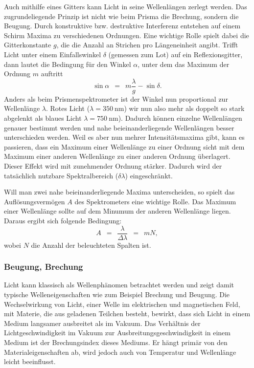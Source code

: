 \documentclass{article}
\newcommand{\widespace}{\enspace}
\newcommand{\wideeq}{\widespace = \widespace}
\begin{document}
Auch mithilfe eines Gitters kann Licht in seine Wellenlängen zerlegt werden.
Das zugrundeliegende Prinzip ist nicht wie beim Prisma die Brechung, sondern
die Beugung. Durch konstruktive bzw. destruktive Interferenz entstehen
auf einem Schirm Maxima zu verschiedenen Ordnungen.
Eine wichtige Rolle spielt dabei die Gitterkonstante $g$, die die Anzahl
an Strichen pro Längeneinheit angibt.
Trifft Licht unter einem Einfallswinkel $\delta$ (gemessen zum Lot)
auf ein Reflexionsgitter, dann lautet die Bedingung für den Winkel $\alpha$,
unter dem das Maximum der Ordnung $m$ auftritt
\[
    \sin \alpha \wideeq m \frac \lambda g - \sin \delta.
\]
Anders als beim Prismenspektrometer ist der Winkel nun proportional zur
Wellenlänge $\lambda$. Rotes Licht ($\lambda = \qty{350}{\nm}$) wir nun
also mehr als doppelt so stark abgelenkt als blaues Licht 
$\lambda = \qty{750}{\nm}$). Dadurch können einzelne Wellenlängen genauer bestimmt
werden und nahe beieinanderliegende Wellenlängen besser unterschieden werden.
Weil es aber nun mehrer Intensitätsmaxima gibt, kann es passieren,
dass ein Maximum einer Wellenlänge zu einer Ordnung sicht mit dem
Maximum einer anderen Wellenlänge zu einer anderen Ordnung überlagert.
Dieser Effekt wird mit zunehmender Ordnung stärker. Dadurch wird der
tatsächlich nutzbare Spektralbereich ($\delta \lambda$) eingeschränkt.

Will man zwei nahe beieinanderliegende Maxima unterscheiden, so spielt das
Auflösungsvermögen $A$ des Spektrometers eine wichtige Rolle.
Das Maximum einer Wellenlänge sollte auf dem Minumum der anderen Wellenlänge
liegen. Daraus ergibt sich folgende Bedingung:
\[
    A \wideeq \frac{\lambda}{\Delta \lambda}
    \wideeq m N,
\]
wobei $N$ die Anzahl der beleuchteten Spalten ist.

\subsubsection{Beugung, Brechung}

Licht kann klassisch als Wellenphänomen betrachtet werden und zeigt
damit typische Welleneigenschaften wie zum Beispiel Brechung und Beugung.
Die Wechselwirkung von Licht, einer Welle im elektrischen und magnetischen Feld,
mit Materie, die aus geladenen Teilchen besteht, bewirkt, dass sich Licht
in einem Medium langsamer ausbreitet als im Vakuum. Das Verhältnis der
Lichtgeschwindigkeit im Vakuum zur Ausbreitungsgeschwindigkeit in einem Medium
ist der Brechungsindex dieses Mediums. Er hängt primär von den Materialeigenschaften
ab, wird jedoch auch von Temperatur und Wellenlänge leicht beeinflusst.
\end{document}
